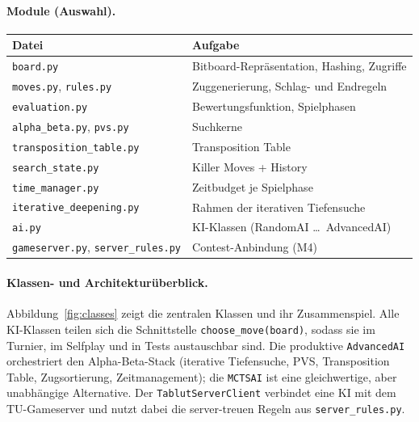 \documentclass[11pt,a4paper]{article}
\newcommand{\code}[1]{\texttt{\small #1}}
\begin{document}
\paragraph{Module (Auswahl).}
\begin{center}
\begin{tabular}{ll}
\toprule
\textbf{Datei} & \textbf{Aufgabe} \\
\midrule
\code{board.py}                & Bitboard-Repr\"asentation, Hashing, Zugriffe \\
\code{moves.py}, \code{rules.py} & Zuggenerierung, Schlag- und Endregeln \\
\code{evaluation.py}           & Bewertungsfunktion, Spielphasen \\
\code{alpha\_beta.py}, \code{pvs.py} & Suchkerne \\
\code{transposition\_table.py} & Transposition Table \\
\code{search\_state.py}        & Killer Moves + History \\
\code{time\_manager.py}        & Zeitbudget je Spielphase \\
\code{iterative\_deepening.py} & Rahmen der iterativen Tiefensuche \\
\code{ai.py}                   & KI-Klassen (RandomAI \dots\ AdvancedAI) \\
\code{gameserver.py}, \code{server\_rules.py} & Contest-Anbindung (M4) \\
\bottomrule
\end{tabular}
\end{center}

\paragraph{Klassen- und Architektur\"uberblick.}
Abbildung~\ref{fig:classes} zeigt die zentralen Klassen und ihr Zusammenspiel.
Alle KI-Klassen teilen sich die Schnittstelle \code{choose\_move(board)}, sodass
sie im Turnier, im Selfplay und in Tests austauschbar sind.
Die produktive \code{AdvancedAI} orchestriert den Alpha-Beta-Stack (iterative
Tiefensuche, PVS, Transposition Table, Zugsortierung, Zeitmanagement); die
\code{MCTSAI} ist eine gleichwertige, aber unabh\"angige Alternative.
Der \code{TablutServerClient} verbindet eine KI mit dem TU-Gameserver und nutzt
dabei die server-treuen Regeln aus \code{server\_rules.py}.
\end{document}
